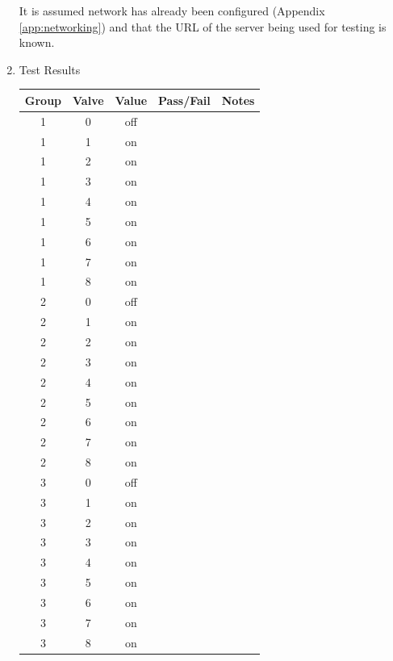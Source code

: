 \documentclass{article}
\begin{document}
\begin{enumerate}
It is assumed network has already been configured
(Appendix \ref{app:networking}) and that the URL of the server being
used for testing is known.

\pagebreak
\item Test Results \\
	\vspace{1em}
	\begin{tabular}{|c|c|c|c|c|}
		\hline
		Group & Valve & Value & Pass/Fail & Notes \\
		\hline
		1 & 0 & off && \hspace{20em} \\
		\hline
		1 & 1 & on && \\
		\hline
		1 & 2 & on && \\
		\hline
		1 & 3 & on && \\
		\hline
		1 & 4 & on && \\
		\hline
		1 & 5 & on && \\
		\hline
		1 & 6 & on && \\
		\hline
		1 & 7 & on && \\
		\hline
		1 & 8 & on && \\
		\hline
		\hline
		2 & 0 & off && \\
		\hline
		2 & 1 & on && \\
		\hline
		2 & 2 & on && \\
		\hline
		2 & 3 & on && \\
		\hline
		2 & 4 & on && \\
		\hline
		2 & 5 & on && \\
		\hline
		2 & 6 & on && \\
		\hline
		2 & 7 & on && \\
		\hline
		2 & 8 & on && \\
		\hline
		\hline
		3 & 0 & off && \\
		\hline
		3 & 1 & on && \\
		\hline
		3 & 2 & on && \\
		\hline
		3 & 3 & on && \\
		\hline
		3 & 4 & on && \\
		\hline
		3 & 5 & on && \\
		\hline
		3 & 6 & on && \\
		\hline
		3 & 7 & on && \\
		\hline
		3 & 8 & on && \\
		\hline
	\end{tabular}
\end{enumerate}

\clearpage
\end{document}
